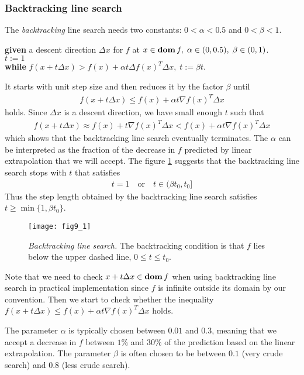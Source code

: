 \subsubsection{Backtracking line search}
The \textit{backtracking} line search needs two constants: $0<\alpha<0.5$ and $0<\beta<1$.
\begin{algorithm}
  $ $\\
  \textbf{given} a descent direction $\Delta x$ for $f$ at $x\in\mathop{\bf dom} f,\;\alpha\in(0,0.5),\;\beta\in(0,1)$.\\
  $t:=1$\\
  \textbf{while} $f(x+t\Delta x)>f(x)+\alpha t\Delta f(x)^T\Delta x,\;t:=\beta t$.
\end{algorithm}
It starts with unit step size and then reduces it by the factor $\beta$ until
\begin{align*}
  f(x+t\Delta x)\le f(x)+\alpha t\nabla f(x)^T\Delta x
\end{align*}
holds. Since $\Delta x$ is a descent direction, we have small enough $t$ such that
\begin{align*}
  f(x+t\Delta x)\approx f(x)+t\nabla f(x)^T\Delta x<f(x)+\alpha t\nabla f(x)^T\Delta x
\end{align*}
which shows that the backtracking line search eventually terminates.
The $\alpha$ can be interpreted as the fraction of the decrease in $f$ predicted by linear extrapolation that we will accept.
The figure \ref{fig:9.1} suggests that the backtracking line search stops with $t$ that satisfies
\begin{align*}
  t=1\quad\text{or}\quad t\in(\beta t_0,t_0]
\end{align*}
Thus the step length obtained by the backtracking line search satisfies $t\ge\min\{1,\beta t_0\}$.\par
\begin{figure}
  \centering
  \texttt{[image: fig9\_1]}
  \caption{\textit{Backtracking line search.} The backtracking condition is that $f$ lies below the upper dashed line, \ie $0\le t\le t_0$.}
  \label{fig:9.1}
\end{figure}
Note that we need to check $x+t\Delta x\in\mathop{\bf dom} f$ when using backtracking line search in practical implementation since $f$ is infinite outside its domain by our convention.
Then we start to check whether the inequality $f(x+t\Delta x)\le f(x)+\alpha t\nabla f(x)^T\Delta x$ holds.\par
The parameter $\alpha$ is typically chosen between $0.01$ and $0.3$, meaning that we accept a decrease in $f$ between $1\%$ and $30\%$ of the prediction based on the linear extrapolation.
The parameter $\beta$ is often chosen to be between $0.1$ (very crude search) and $0.8$ (less crude search).

